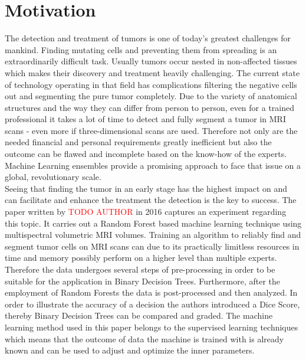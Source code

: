\documentclass[
12pt,
headsepline,
bibliography=totoc,
twoside=semi,
fleqn
]{scrartcl}
\begin{document}

\section{Motivation\label{sec:sec1}}
The detection and treatment of tumors is one of today's greatest challenges for mankind. Finding mutating cells and preventing them from spreading is an extraordinarily difficult task. Usually tumors occur nested in non-affected tissues which makes their discovery and treatment heavily challenging. The current state of technology operating in that field has complications filtering the negative cells out and segmenting the pure tumor completely. Due to the variety of anatomical structures and the way they can differ from person to person, even for a trained professional it takes a lot of time to detect and fully segment a tumor in MRI scans - even more if three-dimensional scans are used. Therefore not only are the needed financial and personal requirements greatly inefficient but also the outcome can be flawed and incomplete based on the know-how of the experts. Machine Learning ensembles provide a promising approach to face that issue on a global, revolutionary scale.\\

Seeing that finding the tumor in an early stage has the highest impact on and can facilitate and enhance the treatment the detection is the key to success. The paper written by \textcolor{red}{TODO AUTHOR} in 2016 captures an experiment regarding this topic. It carries out a Random Forest based machine learning technique using multispectral volumetric MRI volumes. Training an algorithm to reliably find and segment tumor cells on MRI scans can due to its practically limitless resources in time and memory possibly perform on a higher level than multiple experts. Therefore the data undergoes several steps of pre-processing in order to be suitable for the application in Binary Decision Trees. Furthermore, after the employment of Random Forests the data is post-processed and then analyzed. In order to illustrate the accuracy of a decision the authors introduced a Dice Score, thereby Binary Decision Trees can be compared and graded. The machine learning method used in this paper belongs to the supervised learning techniques which means that the outcome of data the machine is trained with is already known and can be used to adjust and optimize the inner parameters.\\
\end{document}
